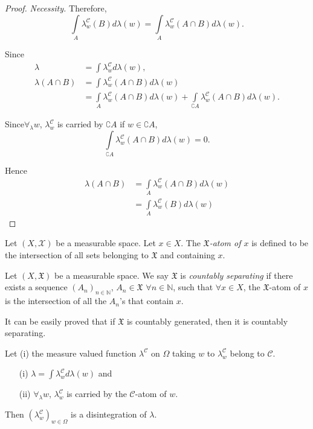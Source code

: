 \begin{proof}{\em Necessity.}
Therefore, 
$$
\int\limits_A \lambda^\mathscr{C}_w (B) d \lambda(w) = \int\limits_A
\lambda^\mathscr{C}_w (A \cap B) d\lambda(w). 
$$

Since
\begin{align*}
\lambda& = \int \lambda^\mathscr{C}_w d \lambda(w),\\
\lambda(A \cap B) & = \int \lambda^\mathscr{C}_w (A \cap B)
d\lambda(w)\\
& = \int\limits_A \lambda^\mathscr{C}_w (A \cap B) d \lambda(w) +
\int\limits_{\complement A} \lambda^\mathscr{C}_w (A \cap B)
d\lambda(w). 
\end{align*}

Since\pageoriginale  $\forall_\lambda w$, $\lambda^\mathscr{C}_w$ is
carried by $\complement A$ if $w \in \complement A$,
$$
\int\limits_{\complement A} \lambda^\mathscr{C}_w (
A \cap B) d \lambda(w) = 0. 
$$

Hence 
\begin{align*}
\lambda(A\cap B) &  = \int\limits_A \lambda^\mathscr{C}_w (A \cap B)
d\lambda(w)\\
& = \int\limits_A \lambda^\mathscr{C}_w (B) d\lambda(w) 
\end{align*}
\end{proof}

\begin{defn}\label{part1:chap3:def50}
Let $(X, \mathscr{X})$ be a measurable space. Let $x \in X$. The {\em
$\mathfrak{X}$-atom of $x$} is defined to be the intersection of all
sets belonging to $\mathfrak{X}$ and containing $x$. 
\end{defn}


\begin{defn}\label{part1:chap3:def51}
Let $(X, \mathfrak{X})$ be a measurable space. We say $\mathfrak{X}$
is {\em countably separating} if there exists a sequence $(A_n)_{n \in
\mathbb{N}}$, $A_n \in \mathfrak{X}$ $\forall n \in \mathbb{N}$, such
that $\forall x \in X$, the $\mathfrak{X}$-atom of $x$ is the
intersection of all the $A_n$'s that contain $x$. 
\end{defn}

It can be easily proved that if $\mathfrak{X}$ is countably generated,
then it is countably separating. 

\begin{proposition}\label{part1:chap3:prop52}
Let (i) the measure valued function $\lambda^\mathscr{C}$ on $\Omega$
taking $w$ to $\lambda^\mathscr{C}_w$ belong to $\mathscr{C}$. 
\begin{itemize}
\item[{\rm (i)}] $\lambda = \int \lambda^\mathscr{C}_w d\lambda(w)$ and 

\item[{\rm (ii)}] $\forall_\lambda w$, $\lambda^\mathscr{C}_w$ is
  carried by the $\mathscr{C}$-atom of $w$.
\end{itemize}

Then $(\lambda^\mathscr{C}_w)_{w \in \Omega}$ is a disintegration of
$\lambda$. 
\end{proposition}

